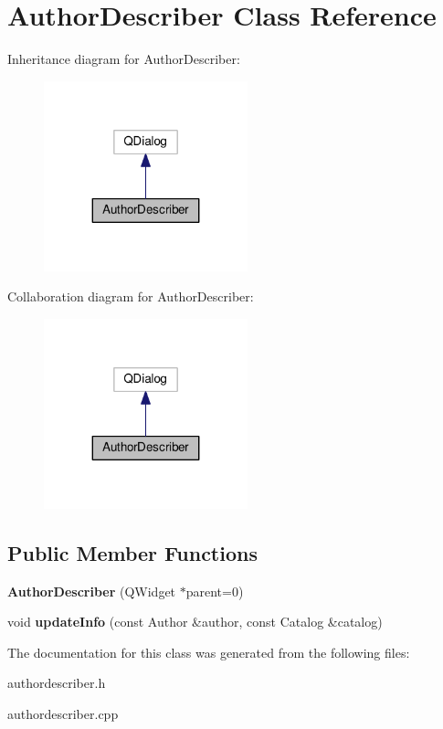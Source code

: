 \hypertarget{class_author_describer}{}\section{Author\+Describer Class Reference}
\label{class_author_describer}


Inheritance diagram for Author\+Describer\+:
\nopagebreak
\begin{figure}[H]
\begin{center}
\leavevmode
\includegraphics[width=167pt]{class_author_describer__inherit__graph}
\end{center}
\end{figure}


Collaboration diagram for Author\+Describer\+:
\nopagebreak
\begin{figure}[H]
\begin{center}
\leavevmode
\includegraphics[width=167pt]{class_author_describer__coll__graph}
\end{center}
\end{figure}
\subsection*{Public Member Functions}
\begin{DoxyCompactItemize}
\item 
{\bfseries Author\+Describer} (Q\+Widget $\ast$parent=0)\hypertarget{class_author_describer_ad83461dd5f92afb961598e720eeb58ec}{}\label{class_author_describer_ad83461dd5f92afb961598e720eeb58ec}

\item 
void {\bfseries update\+Info} (const Author \&author, const Catalog \&catalog)\hypertarget{class_author_describer_a862d4e3172a1b5e03fce798ee9db8e9d}{}\label{class_author_describer_a862d4e3172a1b5e03fce798ee9db8e9d}

\end{DoxyCompactItemize}


The documentation for this class was generated from the following files\+:\begin{DoxyCompactItemize}
\item 
authordescriber.\+h\item 
authordescriber.\+cpp\end{DoxyCompactItemize}
